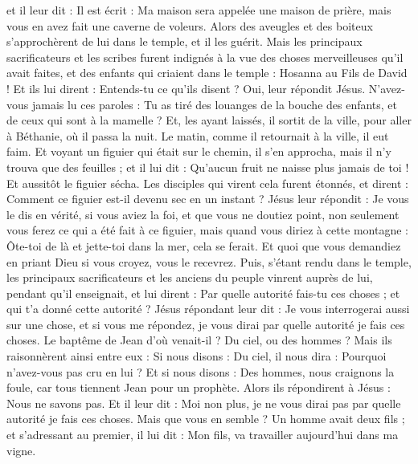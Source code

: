 \begin{multicols}{2}
et il leur dit : Il est écrit : Ma maison sera appelée une maison de prière, mais vous en avez fait une caverne de voleurs.
Alors des aveugles et des boiteux s'approchèrent de lui dans le temple, et il les guérit.
Mais les principaux sacrificateurs et les scribes furent indignés à la vue des choses merveilleuses qu'il avait faites, et des enfants qui criaient dans le temple : Hosanna au Fils de David !
Et ils lui dirent : Entends-tu ce qu'ils disent ? Oui, leur répondit Jésus. N'avez-vous jamais lu ces paroles : Tu as tiré des louanges de la bouche des enfants, et de ceux qui sont à la mamelle ?
Et, les ayant laissés, il sortit de la ville, pour aller à Béthanie, où il passa la nuit.
Le matin, comme il retournait à la ville, il eut faim.
Et voyant un figuier qui était sur le chemin, il s'en approcha, mais il n'y trouva que des feuilles ; et il lui dit : Qu'aucun fruit ne naisse plus jamais de toi ! Et aussitôt le figuier sécha.
Les disciples qui virent cela furent étonnés, et dirent : Comment ce figuier est-il devenu sec en un instant ?
Jésus leur répondit : Je vous le dis en vérité, si vous aviez la foi, et que vous ne doutiez point, non seulement vous ferez ce qui a été fait à ce figuier, mais quand vous diriez à cette montagne : Ôte-toi de là et jette-toi dans la mer, cela se ferait.
Et quoi que vous demandiez en priant Dieu si vous croyez, vous le recevrez.
Puis, s'étant rendu dans le temple, les principaux sacrificateurs et les anciens du peuple vinrent auprès de lui, pendant qu'il enseignait, et lui dirent : Par quelle autorité fais-tu ces choses ; et qui t'a donné cette autorité ?
Jésus répondant leur dit : Je vous interrogerai aussi sur une chose, et si vous me répondez, je vous dirai par quelle autorité je fais ces choses.
Le baptême de Jean d'où venait-il ? Du ciel, ou des hommes ? Mais ils raisonnèrent ainsi entre eux : Si nous disons : Du ciel, il nous dira : Pourquoi n'avez-vous pas cru en lui ?
Et si nous disons : Des hommes, nous craignons la foule, car tous tiennent Jean pour un prophète.
Alors ils répondirent à Jésus : Nous ne savons pas. Et il leur dit : Moi non plus, je ne vous dirai pas par quelle autorité je fais ces choses.
Mais que vous en semble ? Un homme avait deux fils ; et s'adressant au premier, il lui dit : Mon fils, va travailler aujourd'hui dans ma vigne.

\end{multicols}
